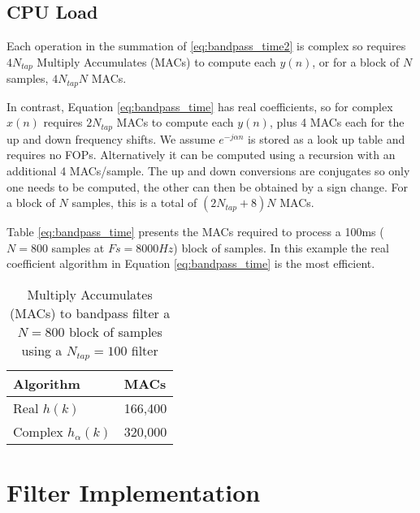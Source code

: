 \documentclass{article}
\begin{document}
\subsection{CPU Load}

Each operation in the summation of \ref{eq:bandpass_time2} is complex so requires $4N_{tap}$ Multiply Accumulates (MACs) to compute each $y(n)$, or for a block of $N$ samples, $4N_{tap}N$ MACs.

In contrast, Equation \ref{eq:bandpass_time} has real coefficients, so for complex $x(n)$ requires $2N_{tap}$ MACs to compute each $y(n)$, plus 4 MACs each for the up and down frequency shifts. We assume $e^{-j \alpha n}$ is stored as a look up table and requires no FOPs. Alternatively it can be computed using a recursion with an additional 4 MACs/sample. The up and down conversions are conjugates so only one needs to be computed, the other can then be obtained by a sign change. For a block of $N$ samples, this is a total of $(2N_{tap}+8)N$ MACs.

Table \ref{eq:bandpass_time} presents the MACs required to process a 100ms ($N=800$ samples at $Fs=8000 Hz$) block of samples.  In this example the real coefficient algorithm in Equation \ref{eq:bandpass_time} is the most efficient.

\begin{table}[h]
\centering
\begin{tabular}{l l }
 \hline
 Algorithm & MACs \\
 \hline
 Real $h(k)$ & 166,400 \\
 Complex $h_{\alpha}(k)$  & 320,000 \\ 
 \hline
\end{tabular}
\caption{Multiply Accumulates (MACs) to bandpass filter a $N=800$ block of samples using a $N_{tap}=100$ filter}
\label{table:ratek1_mean_E}
\end{table}

\section{Filter Implementation}
\end{document}
